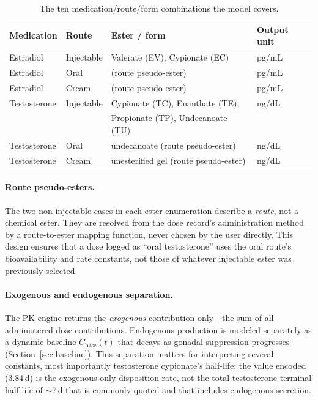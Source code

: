 \documentclass[11pt,a4paper]{article}
\begin{document}
\begin{table}[h]
\centering
\small
\begin{tabular}{@{}llll@{}}
\toprule
\textbf{Medication} & \textbf{Route} & \textbf{Ester / form} & \textbf{Output unit} \\
\midrule
Estradiol     & Injectable   & Valerate (EV), Cypionate (EC) & pg/mL \\
Estradiol     & Oral         & (route pseudo-ester)          & pg/mL \\
Estradiol     & Cream        & (route pseudo-ester)          & pg/mL \\
Testosterone  & Injectable   & Cypionate (TC), Enanthate (TE), & ng/dL \\
              &              & Propionate (TP), Undecanoate (TU) & \\
Testosterone  & Oral         & undecanoate (route pseudo-ester) & ng/dL \\
Testosterone  & Cream        & unesterified gel (route pseudo-ester) & ng/dL \\
\bottomrule
\end{tabular}
\caption{The ten medication/route/form combinations the model covers.}
\label{tab:scope}
\end{table}

\paragraph{Route pseudo-esters.} The two non-injectable cases in each
ester enumeration describe a \emph{route}, not a chemical ester. They
are resolved from the dose record's administration method by a
route-to-ester mapping function, never chosen by the user directly. This
design ensures that a dose logged as ``oral testosterone'' uses the
oral route's bioavailability and rate constants, not those of whatever
injectable ester was previously selected.

\paragraph{Exogenous and endogenous separation.} The PK engine returns
the \emph{exogenous} contribution only---the sum of all administered
dose contributions. Endogenous production is modeled separately as a
dynamic baseline $C_{\text{base}}(t)$ that decays as gonadal suppression
progresses (Section~\ref{sec:baseline}). This separation matters for
interpreting several constants, most importantly testosterone
cypionate's half-life: the value encoded (3.84\,d) is the
exogenous-only disposition rate, not the total-testosterone terminal
half-life of $\sim$7\,d that is commonly quoted and that includes
endogenous secretion.
\end{document}
